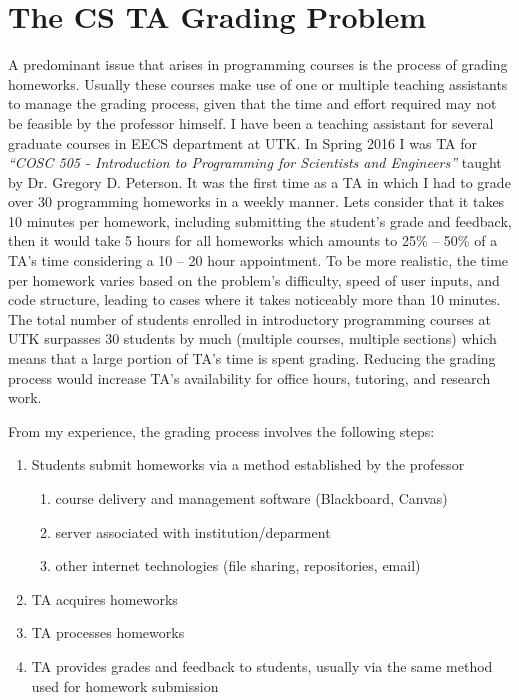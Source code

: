 \section{The CS TA Grading Problem}
\label{sec:problem}

\tab A predominant issue that arises in programming courses is the process of grading homeworks.
Usually these courses make use of one or multiple teaching assistants to manage
the grading process, given that the time and effort required may not be feasible by the
professor himself.
I have been a teaching assistant for several graduate courses in EECS department at UTK.
In Spring 2016 I was TA for \textit{``COSC 505 - Introduction to Programming
for Scientists and Engineers''} taught by Dr. Gregory D. Peterson.
It was the first time as a TA in which I had to grade over 30 programming homeworks
in a weekly manner.
Lets consider that it takes 10 minutes per homework,
including submitting the student's grade and feedback,
then it would take 5 hours for all homeworks which amounts to 25\% -- 50\% of a TA's time
considering a 10 -- 20 hour appointment.
To be more realistic, the time per homework varies based on the problem's difficulty,
speed of user inputs, and code structure,
leading to cases where it takes noticeably more than 10 minutes.
The total number of students enrolled in introductory programming courses at UTK
surpasses 30 students by much (multiple courses, multiple sections) which means
that a large portion of TA's time is spent grading.
Reducing the grading process would increase TA's availability for office hours, tutoring,
and research work. \par
\vspace{1em}

From my experience, the grading process involves the following steps:
\begin{enumerate}
    \item Students submit homeworks via a method established by the professor
    \begin{enumerate}
        \item course delivery and management software (Blackboard, Canvas)
        \item server associated with institution/deparment
        \item other internet technologies (file sharing, repositories, email) 
    \end{enumerate}
    \item TA acquires homeworks
    \item TA processes homeworks
    \item TA provides grades and feedback to students, usually via the same
          method used for homework submission
\end{enumerate}

